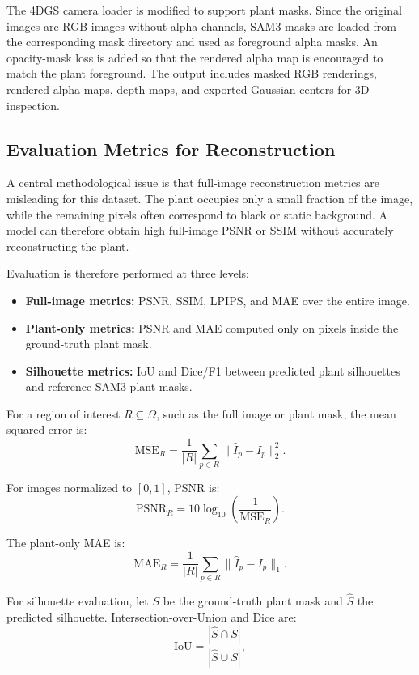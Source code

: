 \documentclass[sigconf]{acmart}
\begin{document}
The 4DGS camera loader is modified to support plant masks. Since the original images are RGB images without alpha channels, SAM3 masks are loaded from the corresponding mask directory and used as foreground alpha masks. An opacity-mask loss is added so that the rendered alpha map is encouraged to match the plant foreground. The output includes masked RGB renderings, rendered alpha maps, depth maps, and exported Gaussian centers for 3D inspection.


\subsection{Evaluation Metrics for Reconstruction}
A central methodological issue is that full-image reconstruction metrics are misleading for this dataset. The plant occupies only a small fraction of the image, while the remaining pixels often correspond to black or static background. A model can therefore obtain high full-image PSNR or SSIM without accurately reconstructing the plant.

Evaluation is therefore performed at three levels:
\begin{itemize}
    \item \textbf{Full-image metrics:} PSNR, SSIM, LPIPS, and MAE over the entire image.
    \item \textbf{Plant-only metrics:} PSNR and MAE computed only on pixels inside the ground-truth plant mask.
    \item \textbf{Silhouette metrics:} IoU and Dice/F1 between predicted plant silhouettes and reference SAM3 plant masks.
\end{itemize}

For a region of interest $R \subseteq \Omega$, such as the full image or plant mask, the mean squared error is:
\begin{equation}
\text{MSE}_{R}
=
\frac{1}{|R|}
\sum_{p \in R}
\lVert \hat{I}_p - I_p \rVert_2^2.
\end{equation}

For images normalized to $[0,1]$, PSNR is:
\begin{equation}
\text{PSNR}_{R}
=
10 \log_{10}
\left(
\frac{1}{\text{MSE}_{R}}
\right).
\end{equation}

The plant-only MAE is:
\begin{equation}
\text{MAE}_{R}
=
\frac{1}{|R|}
\sum_{p \in R}
\lVert \hat{I}_p - I_p \rVert_1.
\end{equation}

For silhouette evaluation, let $S$ be the ground-truth plant mask and $\hat{S}$ the predicted silhouette. Intersection-over-Union and Dice are:
\begin{equation}
\text{IoU}
=
\frac{|\hat{S} \cap S|}
{|\hat{S} \cup S|},
\end{equation}
\end{document}
